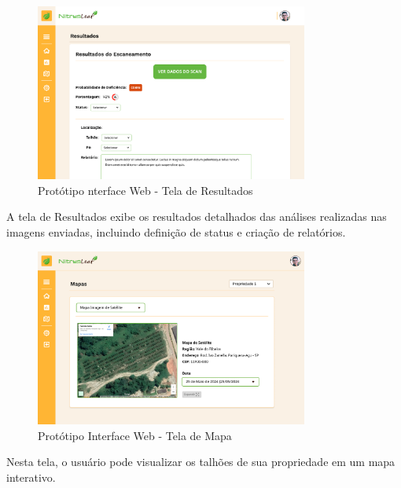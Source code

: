 \begin{figure}[H]
\centering
\caption{Protótipo nterface Web - Tela de Resultados}
\label{fig:interface-web-tela-resultados}
\includegraphics[width=0.8\textwidth]{Images/TelaResultado.png}
\end{figure}

A tela de Resultados exibe os resultados detalhados das análises realizadas nas
imagens enviadas, incluindo definição de status e criação de relatórios.
\medskip


\begin{figure}[H]
\centering
\caption{Protótipo Interface Web - Tela de Mapa}
\label{fig:interface-web-tela-mapa}
\includegraphics[width=0.8\textwidth]{Images/TelaMapa.png}
\end{figure}

Nesta tela, o usuário pode visualizar os talhões de sua propriedade em um
mapa interativo.
\medskip